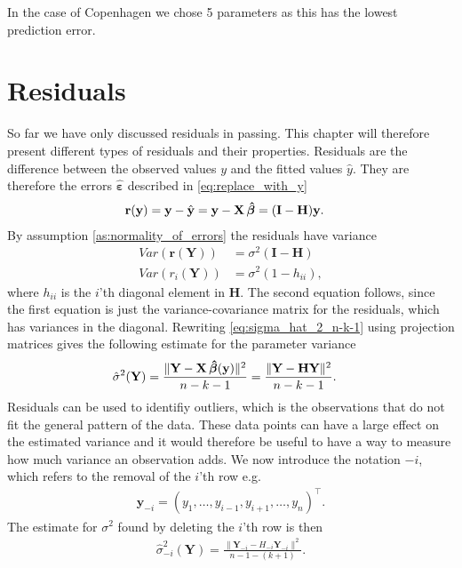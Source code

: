 In the case of Copenhagen we chose 5 parameters as this has the lowest prediction error. 

\section{Residuals}\label{subsec:residuals}
So far we have only discussed residuals in passing. 
This chapter will therefore present different types of residuals and their properties.
Residuals are the difference between the observed values $y$ and the fitted values $\hat{y}$. They are therefore the errors $\boldsymbol{\hat{\varepsilon}}$ described in \eqref{eq:replace_with_y}
\begin{align*}
    \textbf{r}(\textbf{y}) &= \textbf{y} - \hat{\textbf{y}} = \textbf{y} - \textbf{X} \operatorname{\boldsymbol{\hat{\beta}}} = (\textbf{I} - \textbf{H}) \textbf{y}.
\end{align*}
By assumption \ref{as:normality_of_errors} the residuals have variance
\begin{align*}
    Var(\textbf{r}(\textbf{Y})) &= \sigma^2 (\textbf{I} - \textbf{H}) \\
    Var(r_i(\textbf{Y})) &= \sigma^2(1 - h_{ii}),
\end{align*}
where $h_{ii}$ is the $i$'th diagonal element in $\textbf{H}$. The second equation follows, since the first equation is just the variance-covariance matrix for the residuals, which has variances in the diagonal.
Rewriting \eqref{eq:sigma_hat_2_n-k-1} using projection matrices gives the following estimate for the parameter variance
\begin{align*}
    \hat{\sigma}^2(\textbf{Y}) &= \frac{\| \textbf{Y} - \textbf{X} \operatorname{\boldsymbol{\hat{\beta}}} (\textbf{y}) \|^2 }{n-k-1} = \frac{\| \textbf{Y} - \textbf{H} \textbf{Y} \|^2}{n-k-1} .
\end{align*}
Residuals can be used to identifiy outliers, which is the observations that do not fit the general pattern of the data.
These data points can have a large effect on the estimated variance and it would therefore be useful to have a way to measure how much variance an observation adds.
We now introduce the notation $-i$, which refers to the removal of the $i$'th row e.g.
\begin{align*}
    \textbf{y}_{-i} = (y_1, \ldots, y_{i-1}, y_{i+1}, \ldots, y_n)^\top.
\end{align*}
The estimate for $\sigma^2$ found by deleting the $i$'th row is then
\begin{align*}
    \hat{\sigma}^2_{-i}(\textbf{Y}) = \frac{\| \textbf{Y}_{-i} - H_{-i} \textbf{Y}_{-i} \|^2}{n-1-(k+1)}.
\end{align*}
